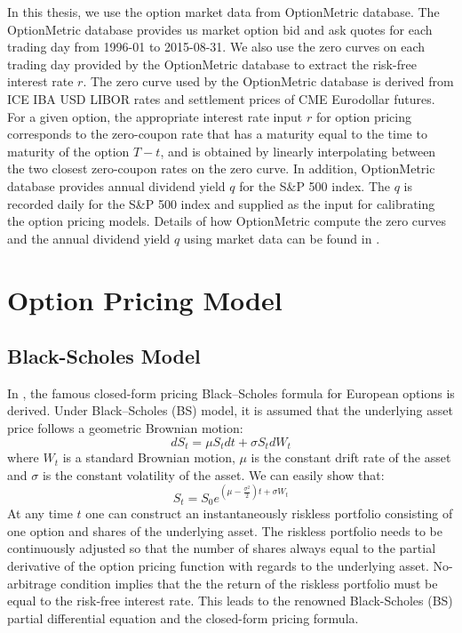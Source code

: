 \documentclass[letterpaper,12pt,titlepage,oneside,final]{book}
\numberwithin{equation}{section}
\theoremstyle{definition}
\begin{document}
In this thesis, we use the option market data from OptionMetric \cite{optionmetrics2008ivy} database. The OptionMetric \cite{optionmetrics2008ivy} database provides us market option bid and ask quotes for each trading day from 1996-01 to 2015-08-31.  We also use the zero curves on each trading day provided by the OptionMetric \cite{optionmetrics2008ivy} database to extract the risk-free interest rate $r$. The zero curve used by the OptionMetric database is derived from ICE IBA USD LIBOR rates and settlement prices of CME Eurodollar futures. For a given option, the appropriate interest rate input $r$ for option pricing corresponds to the zero-coupon rate that has a maturity equal to the time to maturity of the option $T-t$, and is obtained by linearly interpolating between the two closest zero-coupon rates on the zero curve. In addition, OptionMetric \cite{optionmetrics2008ivy} database provides annual  dividend yield $q$ for the S\&P 500 index. The $q$ is recorded daily for the S\&P 500 index and supplied as the input for calibrating the option pricing models.  Details of how OptionMetric compute the zero curves and the annual dividend yield $q$  using market data can be found in \cite{optionmetrics2008ivy}.





\section{Option Pricing Model}
\label{sec:pricing}
\subsection{Black-Scholes Model}
\label{sec:bs}


In  \cite{black1973pricing}, the famous closed-form pricing Black–Scholes formula for European options is derived. 
Under Black–Scholes (BS) model, it is assumed that the underlying asset price follows a geometric Brownian motion:
\[
dS_t=\mu S_t dt+\sigma S_t dW_t
\]
where $W_t$ is a standard Brownian motion, $\mu$ is the constant drift rate of  the asset and $\sigma$ is the constant volatility of the asset. We can easily show that:
\[
S_t=S_0 e^{(\mu-\frac{\sigma^2}{2})t+\sigma W_t}
\]
At any time $t$ one can construct an instantaneously riskless portfolio consisting of one option and shares of the underlying asset. The riskless portfolio needs to be continuously adjusted so that the number of shares always equal to the partial derivative of the option pricing function with regards to the underlying asset. No-arbitrage condition implies that the the return of the riskless portfolio must be equal to the risk-free interest rate. This leads to the renowned Black-Scholes (BS) partial differential equation and the closed-form pricing formula.
\end{document}
